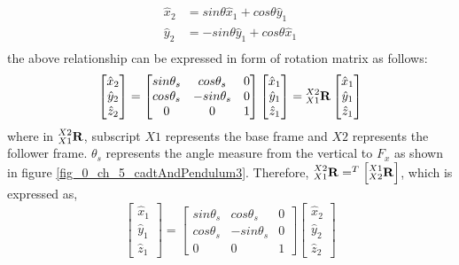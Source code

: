 \begin{align}
	\hat{x}_{2} &= sin\theta \hat{x}_{1} + cos\theta \hat{y}_{1} \\
	\hat{y}_{2} &= -sin\theta \hat{y}_{1} + cos\theta \hat{x}_{1} \\
\end{align}
the above relationship can be expressed in form of rotation matrix as follows:
\begin{equation}
	\begin{bmatrix}
	\hat{x}_{2} \\ \hat{y}_{2} \\ \hat{z}_{2}
	\end{bmatrix} = \begin{bmatrix}
				sin\theta_{s} & cos\theta_{s} & 0 \\
				cos\theta_{s} & -sin\theta_{s} & 0 \\
				0 & 0 & 1
	\end{bmatrix}\begin{bmatrix}
	\hat{x}_{1} \\ \hat{y}_{1} \\ \hat{z}_{1}
	\end{bmatrix} = \prescript{X2}{X1}{\vec{R}} \begin{bmatrix}
	\hat{x}_{1} \\ \hat{y}_{1} \\ \hat{z}_{1}
	\end{bmatrix}
\end{equation}
where in $\prescript{X2}{X1}{\vec{R}}$, subscript $X1$ represents the base frame and $X2$ represents the follower frame. $\theta_{s}$ represents the angle measure from the vertical to $F_{x}$ as shown in figure \ref{fig_0_ch_5_cadtAndPendulum3}. Therefore, $\prescript{X2}{X1}{\vec{R}} = ^{T}\left[\prescript{X1}{X2}{\vec{R}}\right]$, which is expressed as,
\begin{equation}
	\begin{bmatrix}
	\hat{x}_{1} \\ \hat{y}_{1} \\ \hat{z}_{1}
	\end{bmatrix} = \begin{bmatrix}
		sin\theta_{s} & cos\theta_{s} & 0 \\
		cos\theta_{s} & -sin\theta_{s} & 0 \\
		0 & 0 & 1
	\end{bmatrix}\begin{bmatrix}
	\hat{x}_{2} \\ \hat{y}_{2} \\ \hat{z}_{2}
	\end{bmatrix}
\end{equation}
